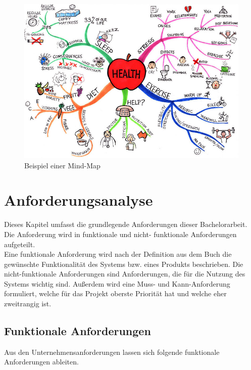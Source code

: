 \begin{figure}[H]
  \centering  
  \includegraphics[scale=1.7]{img/health-mindmap}
  \caption{Beispiel einer Mind-Map}
  \label{fig:mind-map}
\end{figure}

\section{Anforderungsanalyse}
\label{sec:anforderungsanalyse}
Dieses Kapitel umfasst die grundlegende Anforderungen dieser Bachelorarbeit. Die Anforderung wird in funktionale und nicht- funktionale Anforderungen aufgeteilt. 
\\

Eine funktionale Anforderung wird nach der Definition aus dem Buch \cite{Balzert2010} die gewünschte Funktionalität des Systems bzw. eines Produkts beschrieben. 
Die nicht-funktionale Anforderungen sind Anforderungen, die für die Nutzung des Systems wichtig sind. Außerdem wird eine Muss- und Kann-Anforderung formuliert, welche für das Projekt oberste Priorität hat und welche eher zweitrangig ist.

\subsection{Funktionale Anforderungen}
\label{sec:funktionale anforderungen}
Aus den Unternehmensanforderungen lassen sich folgende funktionale Anforderungen ableiten.

